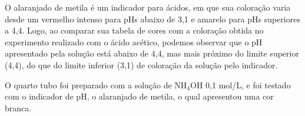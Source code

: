 \begin{figure}[h]
            \label{fig:experimento12}
        \end{figure}
    	
    	\indent O alaranjado de metila é um indicador para ácidos, em que sua coloração varia desde um vermelho intenso para pHs abaixo de 3,1 e amarelo para pHs superiores a 4,4. Logo, ao comparar sua tabela de cores com a coloração obtida no experimento realizado com o ácido acético, podemos observar que o pH apresentado pela solução está abaixo de 4,4, mas mais próximo do limite superior (4,4), do que do limite inferior (3,1) de coloração da solução pelo indicador.

        \newpage

        \indent O quarto tubo foi preparado com a solução de NH$_4$OH 0,1 mol/L, e foi testado com o indicador de pH, o alaranjado de metila, o qual apresentou uma cor branca.


